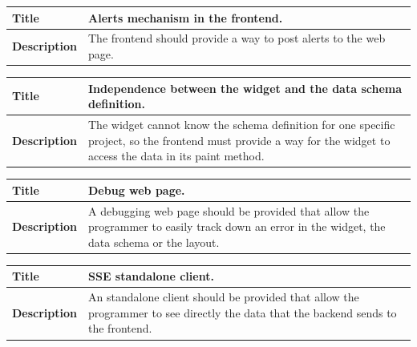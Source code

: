 \documentclass[12pt]{article}
\begin{document}
                \begin{tabularx}{\textwidth}{|l|X|}
                    \hline
                    \textbf{Title} & Alerts mechanism in the frontend. \\
                    \hline
                    \textbf{Description} & The frontend should provide a way to
                    post alerts to the web page. \\
                    \hline
                \end{tabularx}

                \begin{tabularx}{\textwidth}{|l|X|}
                    \hline
                    \textbf{Title} & Independence between the widget and the
                    data schema definition. \\
                    \hline
                    \textbf{Description} & The widget cannot know the schema
                    definition for one specific project, so the frontend must
                    provide a way for the widget to access the data in its paint
                    method. \\
                    \hline
                \end{tabularx}

                \begin{tabularx}{\textwidth}{|l|X|}
                    \hline
                    \textbf{Title} & Debug web page. \\
                    \hline
                    \textbf{Description} & A debugging web page should be
                    provided that allow the programmer to easily track down an
                    error in the widget, the data schema or the layout. \\
                    \hline
                \end{tabularx}

                \begin{tabularx}{\textwidth}{|l|X|}
                    \hline
                    \textbf{Title} & SSE standalone client. \\
                    \hline
                    \textbf{Description} & An standalone client should be
                    provided that allow the programmer to see directly the data
                    that the backend sends to the frontend. \\
                    \hline
                \end{tabularx}
\end{document}
